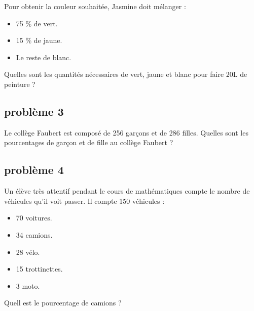 Pour obtenir la couleur souhaitée, Jasmine doit mélanger : 

\begin{itemize}[label={$\bullet$}]
  \item 75 \% de vert.
  \item 15 \% de jaune.
  \item Le reste de blanc.
\end{itemize}

Quelles sont les quantités nécessaires de vert, jaune et blanc pour faire 20L de peinture  ? \\

\Pointilles[8]

\subsection*{problème 3}

Le collège Faubert est composé de 256 garçons et de 286 filles. Quelles sont les pourcentages de garçon et de fille au collège Faubert ? \\

\Pointilles[4]

\subsection*{problème 4}

Un élève très attentif pendant le cours de mathématiques compte le nombre de véhicules qu'il voit passer. Il compte 150 véhicules : 

\begin{multicols}{3}
\begin{itemize}[label={$\bullet$}]
  \item 70 voitures.
  \item 34 camions.
  \item 28 vélo.
  \item 15 trottinettes.
  \item 3 moto.
\end{itemize}
\end{multicols}

Quell est le pourcentage de camions ? \\

\Pointilles[4]

